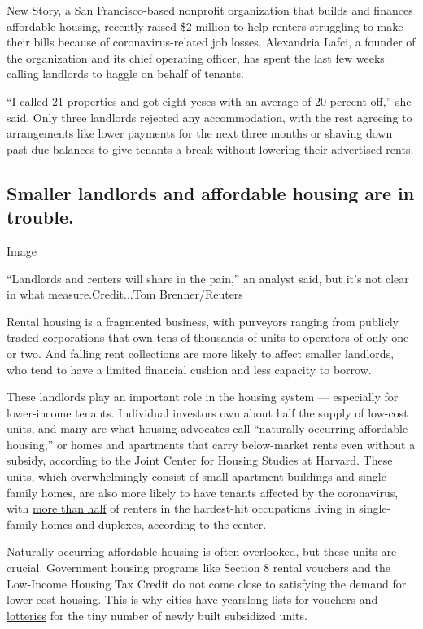 New Story, a San Francisco-based nonprofit organization that builds and
finances affordable housing, recently raised \$2 million to help renters
struggling to make their bills because of coronavirus-related job
losses. Alexandria Lafci, a founder of the organization and its chief
operating officer, has spent the last few weeks calling landlords to
haggle on behalf of tenants.

``I called 21 properties and got eight yeses with an average of 20
percent off,'' she said. Only three landlords rejected any
accommodation, with the rest agreeing to arrangements like lower
payments for the next three months or shaving down past-due balances to
give tenants a break without lowering their advertised rents.

\hypertarget{smaller-landlords-and-affordable-housing-are-in-trouble}{%
\subsection{Smaller landlords and affordable housing are in
trouble.}\label{smaller-landlords-and-affordable-housing-are-in-trouble}}

Image

``Landlords and renters will share in the pain,'' an analyst said, but
it's not clear in what measure.Credit...Tom Brenner/Reuters

Rental housing is a fragmented business, with purveyors ranging from
publicly traded corporations that own tens of thousands of units to
operators of only one or two. And falling rent collections are more
likely to affect smaller landlords, who tend to have a limited financial
cushion and less capacity to borrow.

These landlords play an important role in the housing system ---
especially for lower-income tenants. Individual investors own about half
the supply of low-cost units, and many are what housing advocates call
``naturally occurring affordable housing,'' or homes and apartments that
carry below-market rents even without a subsidy, according to the Joint
Center for Housing Studies at Harvard. These units, which overwhelmingly
consist of small apartment buildings and single-family homes, are also
more likely to have tenants affected by the coronavirus, with
\href{https://www.jchs.harvard.edu/blog/covid-19-rent-shortfalls-in-small-buildings/}{more
than half} of renters in the hardest-hit occupations living in
single-family homes and duplexes, according to the center.

Naturally occurring affordable housing is often overlooked, but these
units are crucial. Government housing programs like Section 8 rental
vouchers and the Low-Income Housing Tax Credit do not come close to
satisfying the demand for lower-cost housing. This is why cities have
\href{https://www.nytimes.com/2017/05/09/magazine/how-homeownership-became-the-engine-of-american-inequality.html}{yearslong
lists for vouchers} and
\href{https://www.nytimes.com/2018/05/12/upshot/these-95-apartments-promised-affordable-rent-in-san-francisco-then-6580-people-applied.html}{lotteries}
for the tiny number of newly built subsidized units.

